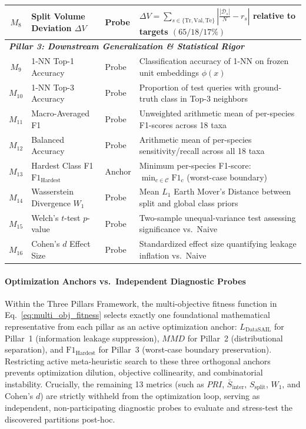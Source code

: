 \documentclass[a4paper,fleqn]{cas-sc}
\begin{document}
\begin{table}[pos=htbp]
\begin{tabular}{cllp{8.2cm}}
$M_8$ & Split Volume Deviation $\Delta V$ & Probe & $\displaystyle \Delta V = \sum_{s \in \{\text{Tr}, \text{Val}, \text{Te}\}} \left| \frac{|\mathcal{D}_s|}{N} - r_s \right|$ relative to targets $(65/18/17\%)$ \\
\midrule
\multicolumn{4}{l}{\textit{\textbf{Pillar 3: Downstream Generalization \& Statistical Rigor}}} \\
$M_9$ & 1-NN Top-1 Accuracy & Probe & Classification accuracy of 1-NN on frozen unit embeddings $\phi(x)$ \\
$M_{10}$ & 1-NN Top-3 Accuracy & Probe & Proportion of test queries with ground-truth class in Top-3 neighbors \\
$M_{11}$ & Macro-Averaged F1 & Probe & Unweighted arithmetic mean of per-species F1-scores across 18 taxa \\
$M_{12}$ & Balanced Accuracy & Probe & Arithmetic mean of per-species sensitivity/recall across all 18 taxa \\
$M_{13}$ & Hardest Class F1 $\mathrm{F1}_{\text{Hardest}}$ & Anchor & Minimum per-species F1-score: $\min_{c \in \mathcal{C}} \mathrm{F1}_c$ (worst-case boundary) \\
$M_{14}$ & Wasserstein Divergence $W_1$ & Probe & Mean $L_1$ Earth Mover's Distance between split and global class priors \\
$M_{15}$ & Welch's $t$-test $p$-value & Probe & Two-sample unequal-variance test assessing significance vs.\ Naive \\
$M_{16}$ & Cohen's $d$ Effect Size & Probe & Standardized effect size quantifying leakage inflation vs.\ Naive \\
\bottomrule
\end{tabular}
\end{table}

\paragraph{Optimization Anchors vs.\ Independent Diagnostic Probes}
Within the Three Pillars Framework, the multi-objective fitness function in Eq.~\eqref{eq:multi_obj_fitness} selects exactly one foundational mathematical representative from each pillar as an active optimization anchor: $L_{\text{DataSAIL}}$ for Pillar~1 (information leakage suppression), $MMD$ for Pillar~2 (distributional separation), and $\mathrm{F1}_{\text{Hardest}}$ for Pillar~3 (worst-case boundary preservation). Restricting active meta-heuristic search to these three orthogonal anchors prevents optimization dilution, objective collinearity, and combinatorial instability. Crucially, the remaining 13 metrics (such as $PRI$, $\bar{S}_{\text{inter}}$, $S_{\text{split}}$, $W_1$, and Cohen's $d$) are strictly withheld from the optimization loop, serving as independent, non-participating diagnostic probes to evaluate and stress-test the discovered partitions post-hoc.
\end{document}
